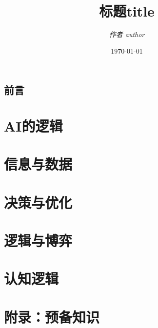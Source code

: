 \documentclass[11pt,a5paper,oneside,fontset=none]{ctexbook}
\title{\bfseries\Huge 标题title}
\author{\itshape\Large 作者 author}
\date{\today}
\begin{document}
\frontmatter
\pagestyle{empty}
\maketitle
\cleardoublepage
\setcounter{page}{1}
\chapter{前言}
\tableofcontents
\mainmatter
\pagestyle{plain}

\part{AI的逻辑}\label{part:AI-logic}



\part{信息与数据}\label{part:information-data}




\part{决策与优化}\label{part:decision-optimization}




\part{逻辑与博弈}\label{part:logic-game}



\part{认知逻辑}\label{part:cognitive-logic}



\appendix
\part{附录：预备知识}




\backmatter


\printindex
\end{document}
